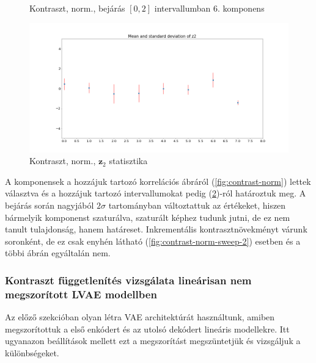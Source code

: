\documentclass[12pt, english]{article}
\begin{document}
\begin{figure}[H]
\begin{minipage}{0.5\linewidth}
    \caption{Kontraszt, norm., bejárás $[0, 2]$ \newline intervallumban $6.$ komponens} 
    \label{fig:contrast-norm-sweep-6}
  \end{minipage}
\end{figure}

\begin{figure}[H]
    \centering
    \includegraphics[width=.85\linewidth]{sweep/norm_contrast_z2_stats.png} 
    \caption{Kontraszt, norm., $\bm{z}_2$ statisztika} 
    \label{fig:contrast-norm-stats}
\end{figure}

\vspace{4mm}

\par A komponensek a hozzájuk tartozó korrelációs ábráról (\ref{fig:contrast-norm}) lettek választva és a hozzájuk tartozó intervallumokat pedig (\ref{fig:contrast-norm-stats})-ról határoztuk meg. A bejárás során nagyjából $2\sigma$ tartományban változtattuk az értékeket, hiszen bármelyik komponenst szaturálva, szaturált képhez tudunk jutni, de ez nem tanult tulajdonság, hanem határeset. Inkrementális kontrasztnövekményt várunk soronként, de ez csak enyhén látható (\ref{fig:contrast-norm-sweep-2}) esetben és a többi ábrán egyáltalán nem.

\vspace{4mm}

\subsubsection{Kontraszt függetlenítés vizsgálata lineárisan nem megszorított LVAE modellben}

\vspace{4mm}

\par Az előző szekcióban olyan létra VAE architektúrát használtunk, amiben megszorítottuk a első enkódert és az utolsó dekódert lineáris modellekre. Itt ugyanazon beállítások mellett ezt a megszorítást megszüntetjük és vizsgáljuk a különbségeket.
\end{document}

